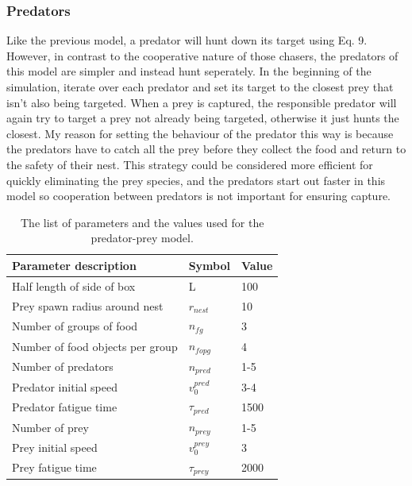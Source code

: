 \documentclass[%
11pt,
amsmath, amssymb,
aps,
pra
]{revtex4-2}
\begin{document}
\subsubsection{Predators}
Like the previous model, a predator will hunt down its target using Eq. 9. However, in contrast to the cooperative nature
of those chasers, the predators of this model are simpler and instead hunt seperately. In the beginning of the simulation,
iterate over each predator and set its target to the closest prey that isn't also being targeted. When a prey is captured,
the responsible predator will again try to target a prey not already being targeted, otherwise it just hunts the closest.
My reason for setting the behaviour of the predator this way is because the predators have to catch all the prey before they
collect the food and return to the safety of their nest. This strategy could be considered more efficient for quickly
eliminating the prey species, and the predators start out faster in this model so cooperation between predators is not important
for ensuring capture.
\begin{table}[t]
\begin{center}
    \setlength\extrarowheight{-3pt}
    \begin{tabularx}{\textwidth}{X p{3cm} p{3cm}}
        \hline\hline
        Parameter description & Symbol & Value \\
        \hline
        Half length of side of box & L & 100 \\
        Prey spawn radius around nest & \(r_{nest}\) & 10 \\
        Number of groups of food & \(n_{fg}\) & 3 \\
        Number of food objects per group & \(n_{fopg}\) & 4 \\
        \hline
        Number of predators & \(n_{pred}\) & 1-5 \\
        Predator initial speed & \(v_0^{pred}\) & 3-4 \\
        Predator fatigue time & \(\tau_{pred}\) & 1500 \\
        \hline
        Number of prey & \(n_{prey}\) & 1-5 \\
        Prey initial speed & \(v_0^{prey}\) & 3 \\
        Prey fatigue time & \(\tau_{prey}\) & 2000\\
        \hline
    \end{tabularx}
    \caption{The list of parameters and the values used for the predator-prey model.}
    \label{tab:predprey}
\end{center}

\end{table}
\end{document}
